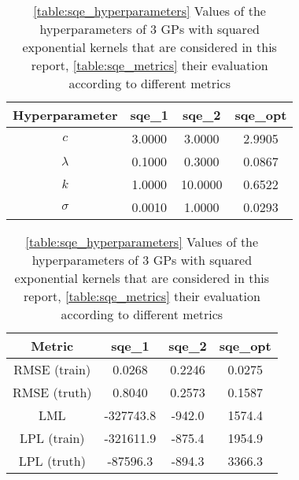 \begin{table}[ht]
    \centering
    \begin{subtable}[t]{0.45\textwidth}
        \centering
        \begin{tabular}[t]{|c|c|c|c|}
            \hline
            Hyperparameter & sqe\_1 & sqe\_2 & sqe\_opt \\
            \hline
            $c$ & 3.0000 & 3.0000 & 2.9905 \\
            $\lambda$ & 0.1000 & 0.3000 & 0.0867 \\
            $k$ & 1.0000 & 10.0000 & 0.6522 \\
            $\sigma$ & 0.0010 & 1.0000 & 0.0293 \\
            \hline
        \end{tabular}
        \caption{}
        \label{table:sqe_hyperparameters}
    \end{subtable}
    \begin{subtable}[t]{0.45\textwidth}
        \centering
        \begin{tabular}[t]{|c|c|c|c|}
            \hline
            Metric & sqe\_1 & sqe\_2 & sqe\_opt \\
            \hline
            RMSE (train) & 0.0268 & 0.2246 & 0.0275 \\
            RMSE (truth) & 0.8040 & 0.2573 & 0.1587 \\
            LML & -327743.8 & -942.0 & 1574.4 \\
            LPL (train) & -321611.9 & -875.4 & 1954.9 \\
            LPL (truth) & -87596.3 & -894.3 & 3366.3 \\
            \hline
        \end{tabular}
        \caption{}
        \label{table:sqe_metrics}
    \end{subtable}
    \caption{\ref{table:sqe_hyperparameters} Values of the hyperparameters of 3 GPs with squared exponential kernels that are considered in this report, \ref{table:sqe_metrics} their evaluation according to different metrics}
    \label{table:sqe}
\end{table}
